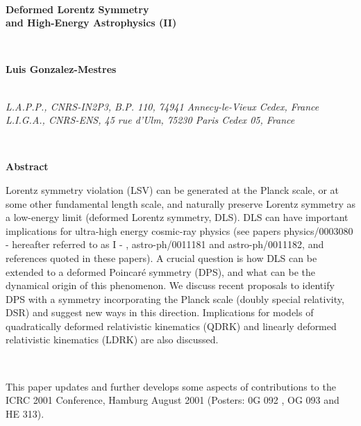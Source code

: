 \documentclass[a4paper,12pt,dvips]{article}
\begin{document}
%
\makeatletter{}
\makeatother\thispagestyle{icrc}
%
%

\begin{center}
%
~ 

{\LARGE \bf Deformed Lorentz Symmetry\\ 
and High-Energy Astrophysics (II)}
\end{center}

\begin{center}
%
%
~ 

{\bf Luis Gonzalez-Mestres\coordHE{}}\\

~ 

{\it {}\coordHE{} L.A.P.P., CNRS-IN2P3, B.P. 110, 74941 Annecy-le-Vieux Cedex, France \\
\coordHE{} L.I.G.A., CNRS-ENS, 45 rue d'Ulm, 75230 Paris Cedex 05, France }
\end{center}

~ 

\begin{center}
{\large \bf Abstract\\}
\end{center}
\vspace{-0.5ex}
%
%
Lorentz symmetry violation (LSV) 
can be generated at the Planck scale, or at some
other fundamental length scale, and
naturally preserve Lorentz symmetry
as a low-energy limit (deformed Lorentz symmetry, DLS). 
DLS can
have important implications for ultra-high energy cosmic-ray physics
(see papers physics/0003080 - hereafter referred to as I - , astro-ph/0011181 and astro-ph/0011182, and references quoted in these papers). A crucial
question is how DLS can be extended to a deformed Poincar\'e symmetry (DPS), and what can be the dynamical origin of this phenomenon. We
discuss recent proposals to identify DPS with a symmetry incorporating the Planck scale (doubly special relativity, DSR) and suggest new ways in this direction. Implications for models of quadratically deformed relativistic kinematics (QDRK) and linearly deformed relativistic kinematics (LDRK) are also discussed.

~ 

This paper updates and further develops some aspects
of contributions to the
ICRC 2001 Conference, Hamburg August 2001 (Posters: 0G 092 , OG 093 and HE 313).
~
%
~
\vspace{1ex}
\end{document}
